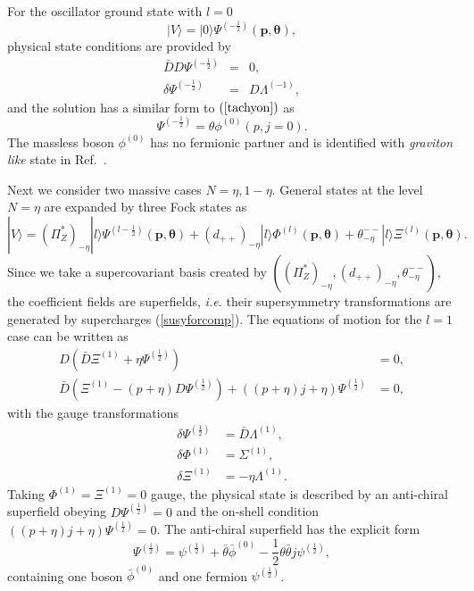 \documentclass[a4paper,seceq,preprint]{ptptex}
\begin{document}
For the oscillator ground state with $l=0$
\begin{equation}
  |V\rangle=
|0\rangle\Psi^{(-\frac{1}{2})}(\boldsymbol p,\boldsymbol\theta),
\end{equation}
physical state conditions are provided by
 \begin{eqnarray}
  \bar D D\Psi^{(-\frac{1}{2})}&=&0,\nonumber\\
  \delta\Psi^{(-\frac{1}{2})}&=&D\Lambda^{(-1)},
 \end{eqnarray}
and the solution has a similar form to $(\ref{tachyon})$ as
\begin{equation}
 \Psi^{(-\frac{1}{2})}=\theta\phi^{(0)}(p,j=0).\label{graviton}
\end{equation}
The massless boson $\phi^{(0)}$ has no fermionic partner
and is identified with {\it graviton like} state in 
Ref.~.

Next we consider two massive cases $N=\eta, 1-\eta$.
General states at the level $N=\eta$ are expanded
by three Fock states as
\begin{equation}
 |V\rangle=
(\Pi^*_Z)_{-\eta}|l\rangle\Psi^{(l-\frac{1}{2})}(\boldsymbol p,\boldsymbol\theta)
+(d_{++})_{-\eta}|l\rangle\Phi^{(l)}(\boldsymbol p,\boldsymbol\theta)
+\theta^{--}_{-\eta}|l\rangle\Xi^{(l)}(\boldsymbol p,\boldsymbol\theta).
\end{equation}
Since we take a supercovariant basis created by 
$((\Pi^*_Z)_{-\eta},(d_{++})_{-\eta},\theta^{--}_{-\eta})$, 
the coefficient fields are superfields, {\it i.e.} their 
supersymmetry transformations are generated by 
supercharges (\ref{susyforcomp}).
The equations of motion for the $l=1$ case can be written as
 \begin{align}
  D\left(\bar D\Xi^{(1)}+\eta\Psi^{(\frac{1}{2})}\right)&=0,
\nonumber\\
  \bar D\left(\Xi^{(1)}-(p+\eta)D\Psi^{(\frac{1}{2})}\right)+
\left((p+\eta)j+\eta\right)\Psi^{(\frac{1}{2})}&=0,
 \end{align}
with the gauge transformations
 \begin{align}
  \delta\Psi^{(\frac{1}{2})}&=\bar D\Lambda^{(1)},\nonumber\\
  \delta\Phi^{(1)}&=\Sigma^{(1)},\nonumber\\
  \delta\Xi^{(1)}&=-\eta\Lambda^{(1)}.
\end{align}
Taking $\Phi^{(1)}=\Xi^{(1)}=0$ gauge, 
the physical state is described by an anti-chiral superfield 
obeying $D\Psi^{(\frac{1}{2})}=0$ and the on-shell condition
$((p+\eta)j+\eta)\Psi^{(\frac{1}{2})}=0$.
The anti-chiral superfield has the explicit form
\begin{equation}
 \Psi^{(\frac{1}{2})}=\psi^{(\frac{1}{2})}
+\bar\theta\bar\phi^{(0)}
-\frac{1}{2}\theta\bar\theta j\psi^{(\frac{1}{2})},
\end{equation}
containing one boson $\bar\phi^{(0)}$ and 
one fermion $\psi^{(\frac{1}{2})}$.
\end{document}
